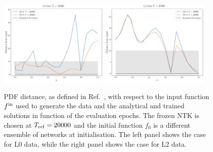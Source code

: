   \begin{figure}[ht!]
    \centering
    \includegraphics[width=0.48\textwidth]{plots/analytical_solution/xT3/distance_from_input/L0/linear/distance_from_input_epoch_20000_L0_linear.pdf}
    \includegraphics[width=0.48\textwidth]{plots/analytical_solution/xT3/distance_from_input/L2/linear/distance_from_input_epoch_20000_L2_linear.pdf}
    \caption{PDF distance, as defined in Ref.~\cite{NNPDF:2021njg}, with respect to
    the input function $f^{\rm in}$ used to generate the data and the analytical and trained
    solutions in function of the evaluation epochs. The frozen NTK
    is chosen at $T_{\rm ref} = 20000$ and the initial function $f_0$ is a different
    ensemble of networks at initialisation. The left panel shows the case for L0 data,
    while the right panel shows the case for L2 data.}
    \label{fig:xT3_distance_L0_L2}
  \end{figure}



